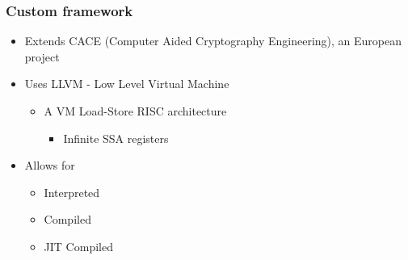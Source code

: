 \documentclass{beamer}
\begin{document}
\begin{frame}
  \frametitle{Custom framework}

  \begin{itemize}
  \item Extends CACE (Computer Aided Cryptography Engineering), an European project
  \item Uses LLVM - Low Level Virtual Machine
    \begin{itemize}
    \item A VM Load-Store RISC architecture
      \begin{itemize}
      \item Infinite SSA registers
      \end{itemize}
    \end{itemize}
  \item Allows for
    \begin{itemize}
    \item Interpreted
    \item Compiled
    \item JIT Compiled
    \end{itemize}
  \end{itemize}
\end{frame}
\end{document}
